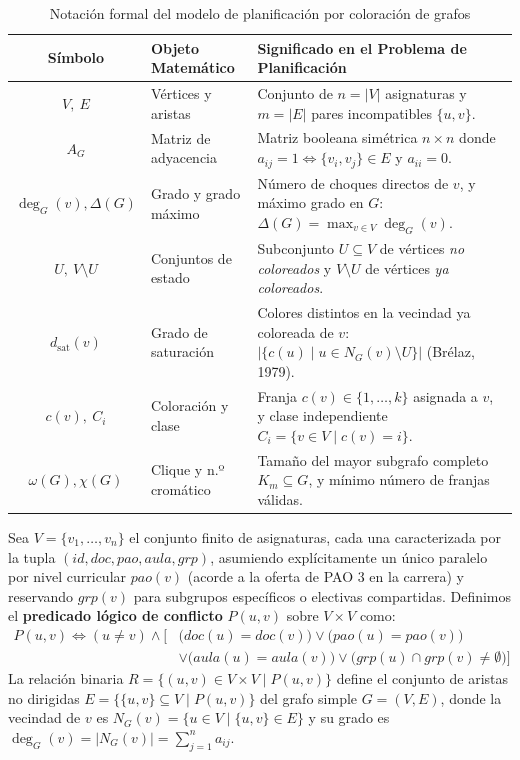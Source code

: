 \documentclass[12pt,a4paper]{article}
\theoremstyle{definition}
\begin{document}
\begin{singlespace}
\begin{table}[H]
\centering
\caption{Notación formal del modelo de planificación por coloración de grafos}
\label{tab:notacion}
\scriptsize
\setlength{\tabcolsep}{4pt}
\renewcommand{\arraystretch}{1.18}
\begin{tabularx}{\textwidth}{|c|L{3.5cm}|Y|}
\hline
{}
\textbf{Símbolo} & \textbf{Objeto Matemático} & \textbf{Significado en el Problema de Planificación} \\ \hline
$V,\ E$ & Vértices y aristas & Conjunto de $n = |V|$ asignaturas y $m = |E|$ pares incompatibles $\{u, v\}$. \\ \hline
$A_G$ & Matriz de adyacencia & Matriz booleana simétrica $n \times n$ donde $a_{ij} = 1 \iff \{v_i, v_j\} \in E$ y $a_{ii} = 0$. \\ \hline
$\deg_G(v), \Delta(G)$ & Grado y grado máximo & Número de choques directos de $v$, y máximo grado en $G$: $\Delta(G) = \max_{v \in V} \deg_G(v)$. \\ \hline
$U,\ V \setminus U$ & Conjuntos de estado & Subconjunto $U \subseteq V$ de vértices \textit{no coloreados} y $V \setminus U$ de vértices \textit{ya coloreados}. \\ \hline
$d_{\text{sat}}(v)$ & Grado de saturación & Colores distintos en la vecindad ya coloreada de $v$: $|\{c(u) \mid u \in N_G(v) \setminus U\}|$ (Brélaz, 1979). \\ \hline
$c(v),\ C_i$ & Coloración y clase & Franja $c(v) \in \{1, \dots, k\}$ asignada a $v$, y clase independiente $C_i = \{v \in V \mid c(v) = i\}$. \\ \hline
$\omega(G), \chi(G)$ & Clique y n.º cromático & Tamaño del mayor subgrafo completo $K_m \subseteq G$, y mínimo número de franjas válidas. \\ \hline
\end{tabularx}
\end{table}

\begin{definicion}
Sea $V = \{v_1, \dots, v_n\}$ el conjunto finito de asignaturas, cada una caracterizada por la tupla $(id, doc, pao, aula, grp)$, asumiendo explícitamente un único paralelo por nivel curricular $pao(v)$ (acorde a la oferta de PAO 3 en la carrera) y reservando $grp(v)$ para subgrupos específicos o electivas compartidas. Definimos el \textbf{predicado lógico de conflicto} $P(u, v)$ sobre $V \times V$ como:
\begin{align*}
P(u, v) \iff (u \neq v) \land \Big[ &\big(doc(u) = doc(v)\big) \lor \big(pao(u) = pao(v)\big) \\
&\lor \big(aula(u) = aula(v)\big) \lor \big(grp(u) \cap grp(v) \neq \emptyset\big) \Big]
\end{align*}
La relación binaria $R = \{(u, v) \in V \times V \mid P(u, v)\}$ define el conjunto de aristas no dirigidas $E = \{\{u, v\} \subseteq V \mid P(u, v)\}$ del grafo simple $G = (V, E)$, donde la vecindad de $v$ es $N_G(v) = \{u \in V \mid \{u, v\} \in E\}$ y su grado es $\deg_G(v) = |N_G(v)| = \sum_{j=1}^n a_{ij}$.
\end{definicion}


\end{singlespace}
\end{document}
